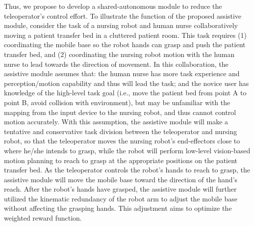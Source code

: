 \documentclass[letterpaper, 11 pt, onecolumn]{article}
\begin{document}
Thus, we propose to develop a shared-autonomous module to reduce the teleoperator's control effort. To illustrate the function of the proposed assistive module, consider the task of a nursing robot and human nurse collaboratively moving a patient transfer bed in a cluttered patient room. This task requires (1) coordinating the mobile base so the robot hands can grasp and push the patient transfer bed, and (2) coordinating the nursing robot motion with the human nurse to lead towards the direction of movement. In this collaboration, the assistive module assumes that: the human nurse has more task experience and perception/motion capability and thus will lead the task; and the novice user has knowledge of the high-level task goal (i.e., move the patient bed from point A to point B, avoid collision with environment), but may be unfamiliar with the mapping from the input device to the nursing robot, and thus cannot control motion accurately. With this assumption, the assistive module will make a tentative and conservative task division between the teleoperator and nursing robot, so that the teleoperator moves the nursing robot's end-effectors close to where he/she intends to grasp, while the robot will perform low-level vision-based motion planning to reach to grasp at the appropriate positions on the patient transfer bed. As the teleoperator controls the robot's hands to reach to grasp, the assistive module will move the mobile base toward the direction of the hand's reach. After the robot's hands have grasped, the assistive module will further utilized the kinematic redundancy of the robot arm to adjust the mobile base without affecting the grasping hands. This adjustment aims to optimize the weighted reward function.

\end{document}
